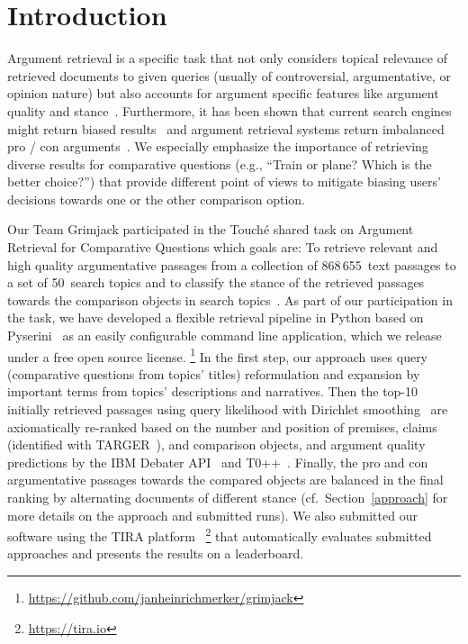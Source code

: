 \section{Introduction}\label{intro}

Argument retrieval is a specific task that not only considers topical relevance of retrieved documents to given queries (usually of controversial, argumentative, or opinion nature) but also accounts for argument specific features like argument quality and stance~\cite{BondarenkoFBGAPBSWPH2020, BondarenkoGFBAPBSWPH2021}.  
Furthermore, it has been shown that current search engines might return biased results~\cite{ShahB2022} and argument retrieval systems return imbalanced pro / con arguments~\cite{CherumanalSSC2021}.
We especially emphasize the importance of retrieving diverse results for comparative questions (e.g., ``Train or plane? Which is the better choice?'') that provide different point of views to mitigate biasing users' decisions towards one or the other comparison option.

Our Team Grimjack participated in the Touch{\'e} shared task on Argument Retrieval for Comparative Questions which goals are: \Ni To retrieve relevant and high quality argumentative passages from a collection of 868\,655~text passages to a set of 50~search topics and \Nii to classify the stance of the retrieved passages towards the comparison objects in search topics~\cite{BondarenkoFKSGBPBSWPH2022}.
As part of our participation in the task, we have developed a flexible retrieval pipeline in Python based on Pyserini~\cite{LinMLYPN2021} as an easily configurable command line application, which we release under a free open source license.%
\footnote{\url{https://github.com/janheinrichmerker/grimjack}}
In the first step, our approach uses query (comparative questions from topics' titles) reformulation and expansion by important terms from topics' descriptions and narratives. Then the top-10 initially retrieved passages using query likelihood with Dirichlet smoothing~\cite{ZhaiL2001} are axiomatically re-ranked based on the number and position of premises, claims (identified with TARGER~\cite{ChernodubOHBHBP2019}), and comparison objects, and argument quality predictions by the IBM Debater API~\cite{ToledoGCFVLJAS2019} and T0++~\cite{SanhWRBSACSLRDBXTSSKCNDCJWMSYPBWNRSSFFTBGBWR2021}.
Finally, the pro and con argumentative passages towards the compared objects are balanced in the final ranking by alternating documents of different stance (cf.\ Section~\ref{approach} for more details on the approach and submitted runs). We also submitted our software using the TIRA platform~\cite{PotthastGWS2019}%
\footnote{\url{https://tira.io}} that automatically evaluates submitted approaches and presents the results on a leaderboard.

